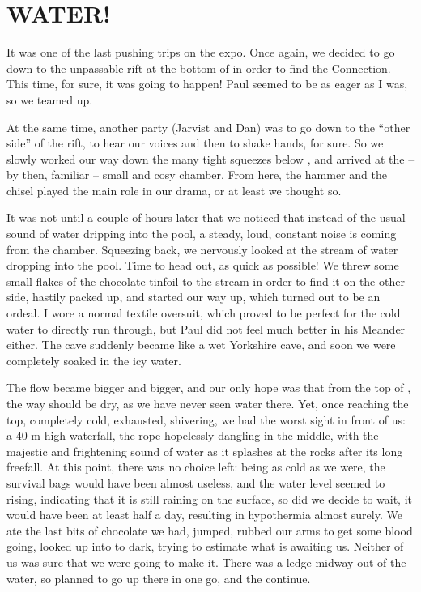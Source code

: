 
\section{WATER!}


It was one of the last pushing trips on the expo. Once again, we decided
to go down to the unpassable rift at the bottom of  in order to
find the Connection. This time, for sure, it was going to happen! Paul
seemed to be as eager as I was, so we teamed up.

At the same time, another party (Jarvist and Dan) was to go down to the
``other side'' of the rift, to hear our voices and then to shake hands,
for sure. So we slowly worked our way down the many tight squeezes below
, and arrived at the -- by then, familiar -- small and cosy
chamber. From here, the hammer and the chisel played the main role in
our drama, or at least we thought so.

It was not until a couple of hours later that we noticed that instead of
the usual sound of water dripping into the pool, a steady, loud,
constant noise is coming from the chamber. Squeezing back, we nervously
looked at the stream of water dropping into the pool. Time to head out,
as quick as possible! We threw some small flakes of the chocolate
tinfoil to the stream in order to find it on the other side, hastily
packed up, and started our way up, which turned out to be an ordeal. I
wore a normal textile oversuit, which proved to be perfect for the cold
water to directly run through, but Paul did not feel much better in his
Meander either. The cave suddenly became like a wet Yorkshire cave, and
soon we were completely soaked in the icy water.

The flow became bigger and bigger, and our only hope was that from the
top of , the way should be dry, as we have never seen water
there. Yet, once reaching the top, completely cold, exhausted,
shivering, we had the worst sight in front of us: a 40 m high waterfall,
the rope hopelessly dangling in the middle, with the majestic and
frightening sound of water as it splashes at the rocks after its long
freefall. At this point, there was no choice left: being as cold as we
were, the survival bags would have been almost useless, and the water
level seemed to rising, indicating that it is still raining on the
surface, so did we decide to wait, it would have been at least half a
day, resulting in hypothermia almost surely. We ate the last bits of
chocolate we had, jumped, rubbed our arms to get some blood going,
looked up into to dark, trying to estimate what is awaiting us. Neither
of us was sure that we were going to make it. There was a ledge midway
out of the water, so planned to go up there in one go, and the continue.

